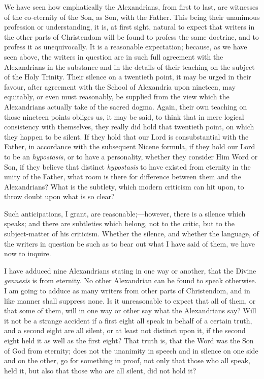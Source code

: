 
We have seen how emphatically the Alexandrians, from first to
last, are witnesses of the co-eternity of the Son, as Son, with the
Father. This being their unanimous profession or understanding, it is,
at first sight, natural to expect that writers in the other parts of
Christendom will be found to profess the same doctrine, and to profess
it as unequivocally. It is a reasonable expectation; because, as we
have seen above, the writers in question are in such full agreement
with the Alexandrians in the substance and in the details of their
teaching on the subject of the Holy Trinity. Their silence on a
twentieth point, it may be urged in their favour, after agreement with
the School of Alexandria upon nineteen, may equitably, or even must
reasonably, be supplied from the view which the Alexandrians actually
take of the sacred dogma. Again, their own teaching on those nineteen
points obliges us, it may be said, to think that in mere logical
consistency with themselves, they really did hold that twentieth
point, on which they happen to be silent. If they hold that our Lord
is consubstantial with the Father, in accordance with the subsequent
Nicene formula, if they hold our Lord to be an \emph{hypostasis}, or
to have a personality, whether they consider Him Word or Son, if they
believe that distinct \emph{hypostasis} to have existed from eternity
in the unity of the Father, what room is there for difference between
them and the Alexandrians? What is the subtlety, which modern
criticism can hit upon, to throw doubt upon what is so clear?

Such anticipations, I grant, are reasonable;—however, there is a
silence which speaks; and there are subtleties which belong, not to
the critic, but to the subject-matter of his criticism. Whether the
silence, and whether the language, of the writers in question be such
as to bear out what I have said of them, we have now to inquire.

I have adduced nine Alexandrians stating in one way or another,
that the Divine \emph{gennesis} is from eternity. No other Alexandrian
can be found to speak otherwise. I am going to adduce as many writers
from other parts of Christendom, and in like manner shall suppress
none. Is it unreasonable to expect that all of them, or that some of
them, will in one way or other say what the Alexandrians say? Will it
not be a strange accident if a first eight all speak in behalf of a
certain truth, and a second eight are all silent, or at least not
distinct upon it, if the second eight held it as well as the first
eight? That truth is, that the Word was the Son of God from eternity;
does not the unanimity in speech and in silence on one side and on the
other, go for something in proof, not only that those who all speak,
held it, but also that those who are all silent, did not hold it?

